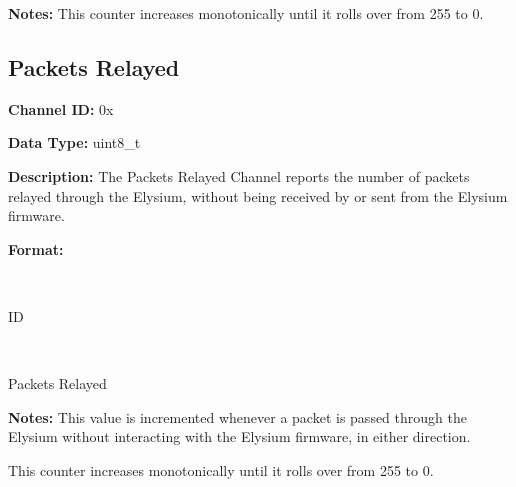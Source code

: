 \documentclass{hitec}
\newcounter{idval}
\newcommand*{\elyid}[0]{0x\padzeroes[2]\Hexadecimal{idval}\addtocounter{idval}{1}}
\newcommand*{\StartTableHeader}{\global\toggletrue{inTableHeader}}
\newcommand*{\EndTableHeader}{\global\togglefalse{inTableHeader}}
\let\OldLongtable\longtable%
\let\OldEndLongtable\endlongtable%
\renewenvironment{longtable}{\StartTableHeader\OldLongtable}{\OldEndLongtable\StartTableHeader}%
\newcommand*{\setlabref}[1]{\gdef\currlabref{#1}}
\newcommand*{\labref}[1]{\iftoggle{inTableHeader}{}{\hyperref[\currlabref]{#1}}}
\let\oldaddcontentsline\addcontentsline
\newcommand{\starttocentries}{\let\addcontentsline\oldaddcontentsline}
\begin{document}
\noindent \textbf{Notes:} This counter increases monotonically until it rolls
over from 255 to 0.

\subsection{Packets Relayed}
\label{chan:slippktrelay}

\noindent \textbf{Channel ID:} \elyid 

\noindent \textbf{Data Type:} uint8\_t

\noindent \textbf{Description:} The Packets Relayed Channel reports the number
of packets relayed through the Elysium, without being received by or sent from
the Elysium firmware.

\noindent \textbf{Format:}
\newline
\newline
\begin{center}
\begin{bytefield}[endianness=big,bitwidth=2.25em]{8}
		\\
		\begin{rightwordgroup}{ID}
		\end{rightwordgroup}\\
		\begin{rightwordgroup}{Packets Relayed}
				\bitbox{8}{Value}
		\end{rightwordgroup}
\end{bytefield}
\end{center}

\noindent \textbf{Notes:} This value is incremented whenever a packet is passed
through the Elysium without interacting with the Elysium firmware, in either
direction.

This counter increases monotonically until it rolls over from 255 to 0.

\starttocentries

\end{document}
